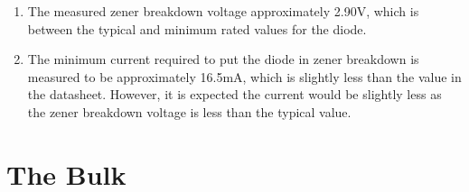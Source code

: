\documentclass[12pt]{article}
\begin{document}
\begin{enumerate}
    \begin{enumerate}
        \item The measured zener breakdown voltage approximately 2.90V, which is between the typical and minimum rated values for the diode.  
        \item The minimum current required to put the diode in zener breakdown is measured to be approximately 16.5mA, which is slightly less than the value in the datasheet. However, it is expected the current would be slightly less as the zener breakdown voltage is less than the typical value.
    \end{enumerate}
\end{enumerate}

\section*{The Bulk}
\end{document}
